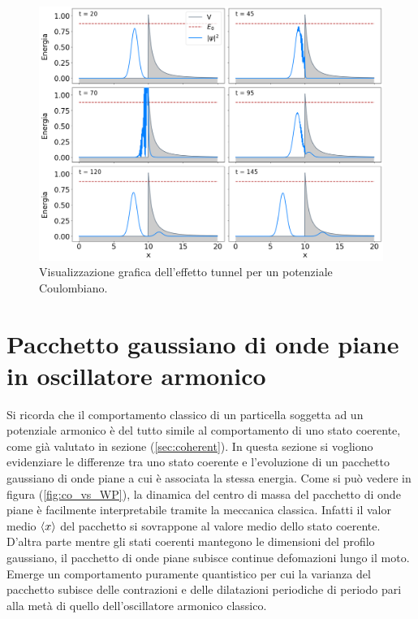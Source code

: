 \begin{figure}
    \centering
    \includegraphics[width = \textwidth]{immagini/tunnel.png}
    \caption{Visualizzazione grafica dell'effetto tunnel per un potenziale Coulombiano.}
    \label{fig:tunnel}
\end{figure}


\section{Pacchetto gaussiano di onde piane in oscillatore armonico}
\label{sec:Wp_arm}

Si ricorda che il comportamento classico di un particella soggetta ad un potenziale armonico è del tutto simile al comportamento di uno stato coerente, come già valutato in sezione (\ref{sec:coherent}).
In questa sezione si vogliono evidenziare le differenze tra uno stato coerente e l'evoluzione di un pacchetto gaussiano di onde piane a cui è associata la stessa energia.
Come si può vedere in figura (\ref{fig:co_vs_WP}), la dinamica del centro di massa del pacchetto di onde piane è facilmente interpretabile tramite la meccanica classica. Infatti il valor medio $\expval{x}$ del pacchetto si sovrappone al valore medio dello stato coerente. D'altra parte mentre gli stati coerenti mantegono le dimensioni del profilo gaussiano, il pacchetto di onde piane subisce continue defomazioni lungo il moto. Emerge un comportamento puramente quantistico per cui la varianza del pacchetto subisce delle contrazioni e delle dilatazioni periodiche di periodo pari alla metà di quello dell'oscillatore armonico classico. \cite{Tsuru:gaus_harmonic}   

